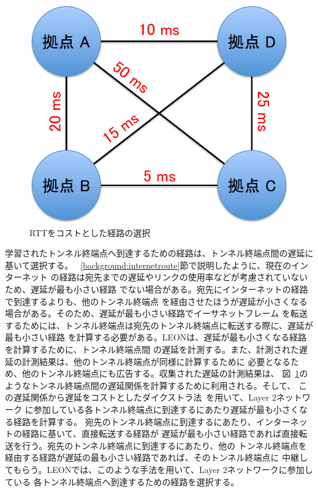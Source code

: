 \begin{figure}
	\begin{center}
		\includegraphics[scale=0.60]{./img/rttascost}
		\caption{RTTをコストとした経路の選択}
		\label{img:rttascost}
	\end{center}
\end{figure}

学習されたトンネル終端点へ到達するための経路は、トンネル終端点間の遅延に基いて選択する。
~\ref{background:internetroute}節で説明したように、現在のインターネット
の経路は宛先までの遅延やリンクの使用率などが考慮されていないため、遅延が最も小さい経路
でない場合がある。宛先にインターネットの経路で到達するよりも、他のトンネル終端点
を経由させたほうが遅延が小さくなる場合がある。そのため、遅延が最も小さい経路でイーサネットフレーム
を転送するためには、トンネル終端点は宛先のトンネル終端点に転送する際に、遅延が最も小さい経路
を計算する必要がある。LEONは、遅延が最も小さくなる経路を計算するために、トンネル終端点間
の遅延を計測する。また、計測された遅延の計測結果は、他のトンネル終端点が同様に計算するために
必要となるため、他のトンネル終端点にも広告する。収集された遅延の計測結果は、
図~\ref{img:rttascost}のようなトンネル終端点間の遅延関係を計算するために利用される。そして、
この遅延関係から遅延をコストとしたダイクストラ法~\cite{dijkstraalgo}を用いて、Layer 2ネットワーク
に参加している各トンネル終端点に到達するにあたり遅延が最も小さくなる経路を計算する。
宛先のトンネル終端点に到達するにあたり、インターネットの経路に基いて、直接転送する経路が
遅延が最も小さい経路であれば直接転送を行う。宛先のトンネル終端点に到達するにあたり、他の
トンネル終端点を経由する経路が遅延の最も小さい経路であれば、そのトンネル終端点に
中継してもらう。LEONでは、このような手法を用いて、Layer 2ネットワークに参加している
各トンネル終端点へ到達するための経路を選択する。

